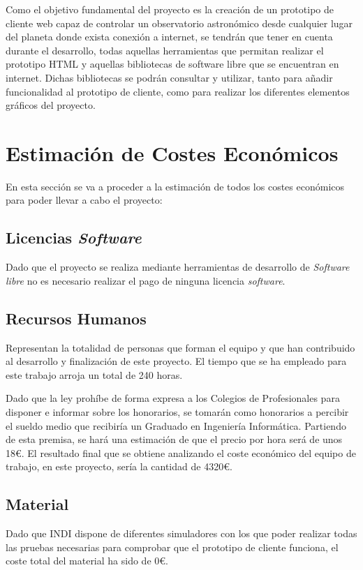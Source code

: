 Como el objetivo fundamental del proyecto es la creación de un prototipo de cliente web capaz de controlar un observatorio astronómico desde cualquier lugar del planeta donde exista conexión a internet, se tendrán que tener en cuenta durante el desarrollo, todas aquellas herramientas que permitan realizar el prototipo HTML y aquellas bibliotecas de software libre que se encuentran en internet. Dichas bibliotecas se podrán consultar y utilizar, tanto para añadir funcionalidad al prototipo de cliente, como para realizar los diferentes elementos gráficos del proyecto.

\section{Estimación de Costes Económicos}
En esta sección se va a proceder a la estimación de todos los costes económicos para poder llevar a cabo el proyecto:

\subsection{Licencias \textit{Software}}
Dado que el proyecto se realiza mediante herramientas de desarrollo de \textit{Software libre} no es necesario realizar el pago de ninguna licencia \textit{software}.

\subsection{Recursos Humanos}
Representan la totalidad de personas que forman el equipo y que han contribuido al desarrollo y finalización de este proyecto. El tiempo que se ha empleado para este trabajo arroja un total de 240 horas.

Dado que la ley prohíbe de forma expresa a los Colegios de Profesionales para disponer e informar sobre los honorarios, se tomarán como honorarios a percibir el sueldo medio que recibiría un Graduado en Ingeniería Informática. Partiendo de esta premisa, se hará una estimación de que el precio por hora será de unos 18\euro. El resultado final que se obtiene analizando el coste económico del equipo de trabajo, en este proyecto, sería la cantidad de 4320\euro.

\subsection{Material}
Dado que INDI dispone de diferentes simuladores con los que poder realizar todas las pruebas necesarias para comprobar que el prototipo de cliente funciona, el coste total del material ha sido de 0\euro.


